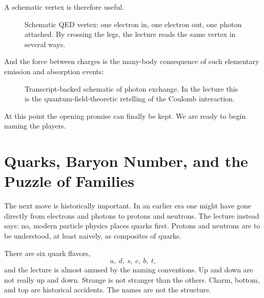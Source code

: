 A schematic vertex is therefore useful.

\begin{figure}[h]
\centering
{}
\caption{Schematic QED vertex: one electron in, one electron out, one photon attached. By crossing the legs, the lecture reads the same vertex in several ways.}
\end{figure}

And the force between charges is the many-body consequence of such elementary emission and absorption events:

\begin{figure}[h]
\centering
{}
\caption{Transcript-backed schematic of photon exchange. In the lecture this is the quantum-field-theoretic retelling of the Coulomb interaction.}
\end{figure}

At this point the opening promise can finally be kept. We are ready to begin naming the players.

\section{Quarks, Baryon Number, and the Puzzle of Families}

The next move is historically important. In an earlier era one might have gone directly from electrons and photons to protons and neutrons. The lecture instead says: no, modern particle physics places quarks first. Protons and neutrons are to be understood, at least naively, as composites of quarks.

There are six quark flavors,
\begin{equation}
u,\ d,\ s,\ c,\ b,\ t,
\end{equation}
and the lecture is almost amused by the naming conventions. Up and down are not really up and down. Strange is not stranger than the others. Charm, bottom, and top are historical accidents. The names are not the structure.

